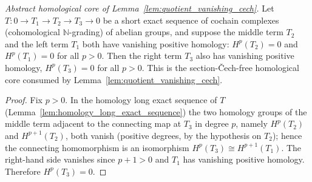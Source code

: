 \begin{lemma}\leanok
  \label{lem:cech_homology_quotient_vanishing}
  \textit{Abstract homological core of Lemma~\ref{lem:quotient_vanishing_cech}.}
  Let \(T : 0 \to T_1 \to T_2 \to T_3 \to 0\) be a short exact sequence of cochain complexes
  (cohomological \(\mathbb{N}\)-grading) of abelian groups, and suppose the middle term \(T_2\) and
  the left term \(T_1\) both have vanishing positive homology: \(H^p(T_2) = 0\) and \(H^p(T_1) = 0\)
  for all \(p > 0\). Then the right term \(T_3\) also has vanishing positive homology, \(H^p(T_3) =
  0\) for all \(p > 0\). This is the section-Čech-free homological core consumed by
  Lemma~\ref{lem:quotient_vanishing_cech}.
\end{lemma}
\begin{proof}
  \leanok
  Fix \(p > 0\). In the homology long exact sequence of \(T\)
  (Lemma~\ref{lem:homology_long_exact_sequence}) the two homology groups of the middle term
  adjacent to the connecting map at \(T_3\) in degree \(p\), namely \(H^p(T_2)\) and \(H^{p+1}(T_2)\),
  both vanish (positive degrees, by the hypothesis on \(T_2\)); hence the connecting homomorphism is
  an isomorphism \(H^p(T_3) \cong H^{p+1}(T_1)\). The right-hand side vanishes since \(p + 1 > 0\)
  and \(T_1\) has vanishing positive homology. Therefore \(H^p(T_3) = 0\).
\end{proof}

